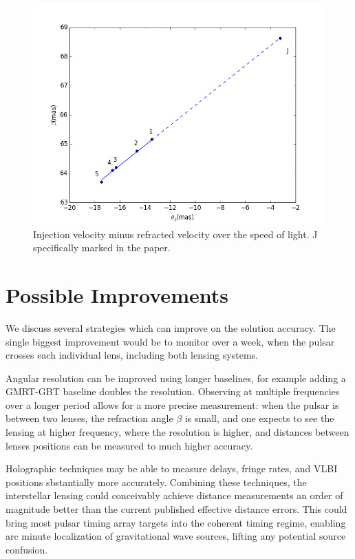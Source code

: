 \documentclass[useAMS,usenatbib]{mn2e}
\begin{document}
\begin{figure}
\centering
\includegraphics[width=1.0\linewidth,angle=0]{Reflection_angle.png}
\caption{Injection velocity minus refracted velocity over the speed of light. J specifically marked in the paper.}
\label{vtrans}
\end{figure}



\section{Possible Improvements}

We discuss several strategies which can improve on the solution
accuracy.  The single biggest improvement would be to monitor over a
week, when the pulsar crosses each individual lens, including both
lensing systems.

Angular resolution can be improved using longer baselines, for example
adding a GMRT-GBT baseline doubles the resolution.  Observing at
multiple frequencies over a longer period allows for a more precise
measurement: when the pulsar is between two lenses, the refraction
angle $\beta$ is small, and one expects to see the lensing at higher
frequency, where the resolution is higher, and distances between
lenses positions can be measured to much higher accuracy.

Holographic techniques \citep{2008MNRAS.388.1214W,2014MNRAS.440L..36P}
may be able to measure delays, fringe rates, and VLBI positions
sbstantially more accurately.  Combining these techniques, the
interstellar lensing could conceivably achieve distance measurements
an order of magnitude better than the current published effective
distance errors.  This could bring most pulsar timing array targets
into the coherent timing regime, enabling arc minute localization of
gravitational wave sources, lifting any potential source confusion.
\end{document}
